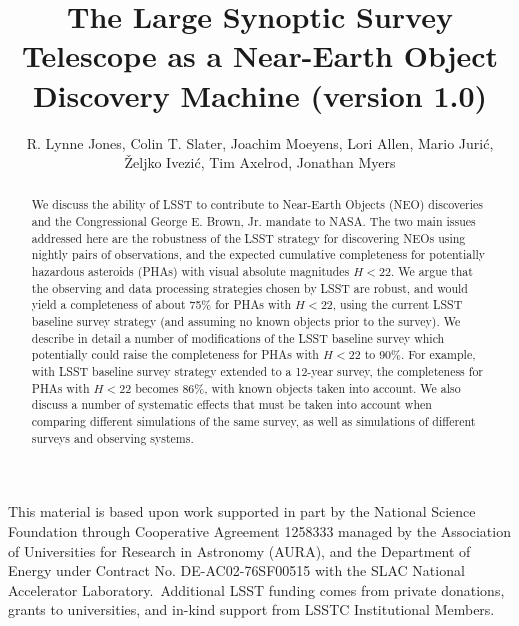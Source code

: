 \documentclass[12pt,preprint]{aastex}
\begin{document}
\title{The Large Synoptic Survey Telescope as a Near-Earth Object Discovery Machine (version 1.0)}

\author{R. Lynne Jones,
Colin T. Slater,
Joachim Moeyens,
Lori Allen,
Mario Juri\'{c},
\v{Z}eljko Ivezi\'{c},
Tim Axelrod,
Jonathan Myers
}

\begin{abstract}
We discuss the ability of LSST to contribute to Near-Earth Objects (NEO) discoveries and
the Congressional George E. Brown, Jr. mandate to NASA. The two main issues addressed
here are the robustness of the LSST strategy for discovering NEOs using nightly pairs of
observations, and the expected cumulative completeness for potentially hazardous asteroids
(PHAs) with visual absolute magnitudes $H<22$.  We argue that the observing and data
processing strategies chosen by LSST are robust, and would yield a completeness of about
75\% for PHAs with $H<22$, using the current LSST baseline survey strategy (and assuming
no known objects prior to the survey). We describe in detail a number of modifications of the
LSST baseline survey which potentially could raise the completeness for PHAs with $H<22$
to 90\%. For example, with LSST baseline survey strategy extended to a 12-year survey,
the completeness for PHAs with $H<22$ becomes 86\%, with known objects taken into
account. We also discuss a number of systematic effects that must be taken into account
when comparing different simulations of the same survey, as well as simulations of different
surveys and observing systems.
\end{abstract}














\acknowledgements
This material is based upon work supported in part by the National Science
Foundation through Cooperative Agreement 1258333 managed by the Association of
Universities for Research in Astronomy (AURA), and the Department of Energy
under Contract No. DE-AC02-76SF00515 with the SLAC National Accelerator
Laboratory. Additional LSST funding comes from private donations, grants to
universities, and in-kind support from LSSTC Institutional Members.

\appendix


% 


\end{document}
